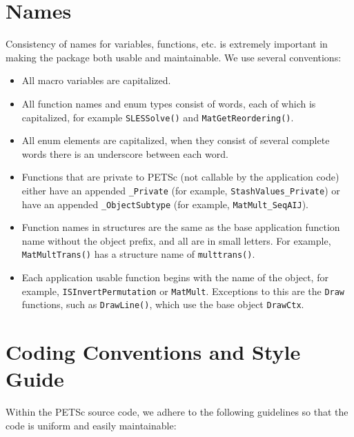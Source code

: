\section{Names}
Consistency of names for variables, functions, etc. is extremely 
important in making the package both usable and maintainable.
We use several conventions:
\begin{itemize}
\item All macro variables are capitalized.
\item All function names and enum types consist of words, each of 
      which is capitalized, for example {\tt SLESSolve()} and 
      {\tt MatGetReordering()}.
\item All enum elements are capitalized, when they consist of several
      complete words there is an underscore between each word.
\item Functions that are private to PETSc (not callable by the 
      application code) either
\subitem have an appended {\tt \_Private} (for example, 
         {\tt StashValues\_Private}) or
\subitem have an appended {\tt \_ObjectSubtype} (for example,
         {\tt MatMult\_SeqAIJ}).
\item Function names in structures are the same as the base application
      function name without the object prefix, and all are in small letters. 
      For example, {\tt MatMultTrans()} has a structure name of 
      {\tt multtrans()}.
\item Each application usable function begins with the name of the object, 
      for example, {\tt ISInvertPermutation} or {\tt MatMult}. Exceptions
      to this are the {\tt Draw} functions, such as {\tt DrawLine()},
      which use the base object {\tt DrawCtx}. 
\end{itemize}

\section{Coding Conventions and Style Guide}

Within the PETSc source code, we adhere to the following guidelines
so that the code is uniform and easily maintainable:

